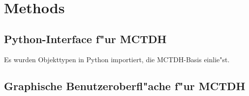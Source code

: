 \chapter{Methods}

\section{Python-Interface f"ur MCTDH}

Es wurden Objekttypen in Python importiert, die MCTDH-Basis einlie"st. 


\section{Graphische Benutzeroberfl"ache f"ur MCTDH}